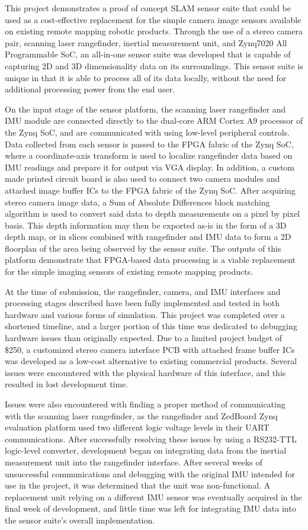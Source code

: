 This project demonstrates a proof of concept SLAM sensor suite that could be used as a cost-effective replacement for the simple camera image sensors available on existing remote mapping robotic products. Through the use of a stereo camera pair, scanning laser rangefinder, inertial measurement unit, and Zynq7020 All Programmable SoC, an all-in-one sensor suite was developed that is capable of capturing 2D and 3D dimensionality data on its surroundings. This sensor suite is unique in that it is able to process all of its data locally, without the need for additional processing power from the end user.
\par
On the input stage of the sensor platform, the scanning laser rangefinder and IMU module are connected directly to the dual-core ARM Cortex A9 processor of the Zynq SoC, and are communicated with using low-level peripheral controls. Data collected from each sensor is passed to the FPGA fabric of the Zynq SoC, where a coordinate-axis transform is used to localize rangefinder data based on IMU readings and prepare it for output via VGA display. In addition, a custom made printed circuit board is also used to connect two camera modules and attached image buffer ICs to the FPGA fabric of the Zynq SoC. After acquiring stereo camera image data, a Sum of Absolute Differences block matching algorithm is used to convert said data to depth measurements on a pixel by pixel basis. This depth information may then be exported as-is in the form of a 3D depth map, or in slices combined with rangefinder and IMU data to form a 2D floorplan of the area being observed by the sensor suite. The outputs of this platform demonstrate that FPGA-based data processing is a viable replacement for the simple imaging sensors of existing remote mapping products. 
\par
At the time of submission, the rangefinder, camera, and IMU interfaces and processing stages described have been fully implemented and tested in both hardware and various forms of simulation. This project was completed over a shortened timeline, and a larger portion of this time was dedicated to debugging hardware issues than originally expected. Due to a limited project budget of \$250, a customized stereo camera interface PCB with attached frame buffer ICs was developed as a low-cost alternative to existing commercial products. Several issues were encountered with the physical hardware of this interface, and this resulted in lost development time. 
\par
Issues were also encountered with finding a proper method of communicating with the scanning laser rangefinder, as the rangefinder and ZedBoard Zynq evaluation platform used two different logic voltage levels in their UART communications.  After successfully resolving these issues by using a RS232-TTL logic-level converter, development began on integrating data from the inertial measurement unit into the rangefinder interface. After several weeks of unsuccessful communications and debugging with the original IMU intended for use in the project, it was determined that the unit was non-functional. A replacement unit relying on a different IMU sensor was eventually acquired in the final week of development, and little time was left for integrating IMU data into the sensor suite's overall implementation.
